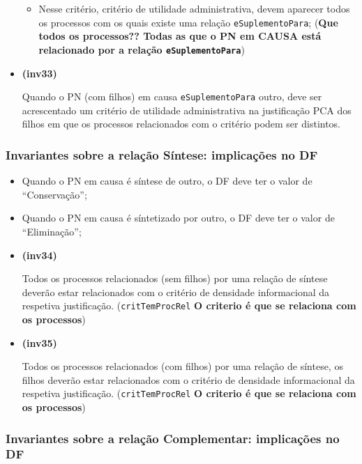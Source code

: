 \documentclass[tikz,runningheads,a4paper]{llncs}
\begin{document}
\begin{subappendices}
\begin{itemize}
  \begin{itemize}
  \tightlist
  \item
    Nesse critério, critério de utilidade administrativa, devem aparecer
    todos os processos com os quais existe uma relação
    \texttt{eSuplementoPara}; (\textbf{Que todos os processos?? Todas as
    que o PN em CAUSA está relacionado por a relação
    \texttt{eSuplementoPara}})
  \end{itemize}
\item
  \hypertarget{inv33}{\textbf{(inv33)}} Quando o PN (com filhos) em causa
  \texttt{eSuplementoPara} outro, deve ser acrescentado um critério de
  utilidade administrativa na justificação PCA dos filhos em que os
  processos relacionados com o critério podem ser distintos.
\end{itemize}

\hypertarget{invariantes-sobre-a-relacao-sintese-implicacoes-no-df}{%
\subsubsection{Invariantes sobre a relação Síntese: implicações no
DF}\label{invariantes-sobre-a-relauxe7uxe3o-suxedntese-implicauxe7uxf5es-no-df}}

\begin{itemize}
\tightlist
\item
  Quando o PN em causa é síntese de outro, o DF deve ter o valor de
  ``Conservação'';
\item
  Quando o PN em causa é síntetizado por outro, o DF deve ter o valor de
  ``Eliminação'';
\item
  \hypertarget{inv34}{\textbf{(inv34)}} Todos os processos relacionados (sem filhos) por uma
  relação de síntese deverão estar relacionados com o critério de
  densidade informacional da respetiva justificação.
  (\texttt{critTemProcRel} \textbf{O criterio é que se relaciona com os
  processos})
\item
  \hypertarget{inv35}{\textbf{(inv35)}} Todos os processos relacionados (com filhos) por uma
  relação de síntese, os filhos deverão estar relacionados com o
  critério de densidade informacional da respetiva justificação.
  (\texttt{critTemProcRel} \textbf{O criterio é que se relaciona com os
  processos})
\end{itemize}

\hypertarget{invariantes-sobre-a-relacao-complementar-implicacoes-no-df}{%
\subsubsection{Invariantes sobre a relação Complementar: implicações no
DF}\label{invariantes-sobre-a-relauxe7uxe3o-complementar-implicauxe7uxf5es-no-df}}


\end{subappendices}
\end{document}
